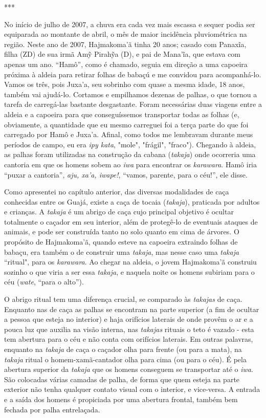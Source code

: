 ***

No início de julho de 2007, a chuva era cada vez mais escassa e sequer
podia ser equiparada ao montante de abril, o mês de maior incidência
pluviométrica na região. Neste ano de 2007, Hajmakoma'ã tinha 20 anos;
casado com Panaxĩa, filha (ZD) de sua irmã Amỹ Pirahỹa (D), e pai de
Mana'ĩa, que estava com apenas um ano. ``Hamô'', como é chamado, seguia
em direção a uma capoeira próxima à aldeia para retirar folhas de babaçú
e me convidou para acompanhá-lo. Vamos os três, pois Juxa'a, seu
sobrinho com quase a mesma idade, 18 anos, também vai ajudá-lo. Cortamos
e empilhamos dezenas de palhas, o que tornou a tarefa de carregá-las
bastante desgastante. Foram necessárias duas viagens entre a aldeia e a
capoeira para que conseguíssemos transportar todas as folhas (e,
obviamente, a quantidade que eu mesmo carreguei foi a terça parte do que
foi carregado por Hamô e Juxa'a. Afinal, como todos me lembravam durante
meus períodos de campo, eu era \emph{ipy kata}, "mole", "frágil",
"fraco"). Chegando à aldeia, as palhas foram utilizadas na construção da
cabana (\emph{takaja}) onde ocorreria uma cantoria em que os homens
sobem ao \emph{iwa} para encontrar os \emph{karawara}. Hamô iria ``puxar
a cantoria'', \emph{aju, xa'a, iwape!}, ``vamos, parente, para o céu!'',
ele disse.

Como apresentei no capítulo anterior, das diversas modalidades de caça
conhecidas entre os Guajá, existe a caça de tocaia (\emph{takaja}),
praticada por adultos e crianças. A \emph{takaja} é um abrigo de caça
cujo principal objetivo é ocultar totalmente o caçador em seu interior,
além de protegê-lo de eventuais ataques de animais, e pode ser
construída tanto no solo quanto em cima de árvores. O propósito de
Hajmakoma'ã, quando esteve na capoeira extraindo folhas de babaçu, era
também o de construir uma \emph{takaja}, mas nesse caso uma
\emph{takaja} ``ritual", para os \emph{karawara}. Ao chegar na aldeia, o
jovem Hajmakoma'ã construiu sozinho o que viria a ser essa
\emph{takaja}, e naquela noite os homens subiriam para o céu
(\emph{wate}, ``para o alto'').

O abrigo ritual tem uma diferença crucial, se comparado às
\emph{takajas} de caça. Enquanto nas de caça as palhas se encontram na
parte superior (a fim de ocultar a pessoa que esteja no interior) e haja
orifícios laterais de onde provêm o ar e a pouca luz que auxilia na
visão interna, nas \emph{takajas} rituais o teto é vazado - esta tem
abertura para o céu e não conta com orifícios laterais. Em outras
palavras, enquanto na \emph{takaja} de caça o caçador olha para frente
(ou para a mata), na \emph{takaja} ritual o homem-xamã-cantador olha
para cima (ou para o céu). É pela abertura superior da \emph{takaja} que
os homens conseguem se transportar até o \emph{iwa}. São colocadas
várias camadas de palha, de forma que quem esteja na parte exterior não
tenha qualquer contato visual com o interior, e vice-versa. A entrada e
a saída dos homens é propiciada por uma abertura frontal, também bem
fechada por palha entrelaçada.

